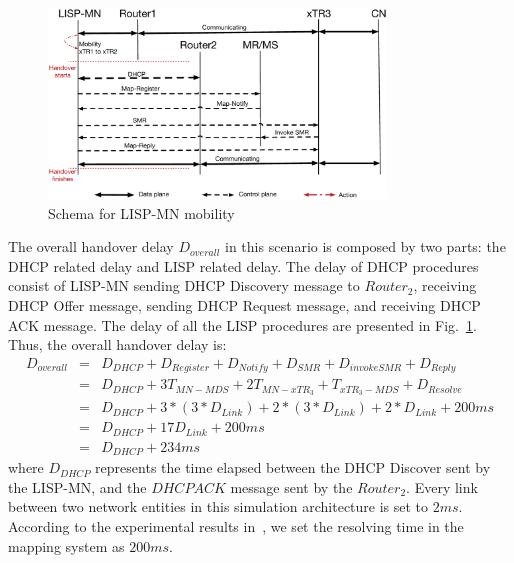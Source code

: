 {%
\begin{figure}[!th]
	\centering
	\includegraphics[width=0.8\textwidth]{Pics/Mobility_LISPMN_schema_SMR_simplify}
	\caption{Schema for LISP-MN mobility}
	\label{sim_schema_LISPMN}
\end{figure}

The overall handover delay $D_{overall}$ in this scenario is composed by two parts: the DHCP related delay and LISP related delay. The delay of DHCP procedures consist of LISP-MN sending DHCP Discovery message to $Router_2$, receiving DHCP Offer message, sending DHCP Request message, and receiving DHCP ACK message. The delay of all the LISP procedures are presented in Fig.~\ref{sim_schema_LISPMN}. Thus, the overall handover delay is:
\begin{eqnarray}
D_{overall} &=& D_{DHCP} + D_{Register} + D_{Notify} + D_{SMR} + D_{invokeSMR} + D_{Reply} \nonumber \\
&=& D_{DHCP} + 3T_{MN-MDS} + 2T_{MN-xTR_3} + T_{xTR_3-MDS} + D_{Resolve} \nonumber \\
&=& D_{DHCP} + 3* (3*D_{Link}) + 2*(3*D_{Link}) + 2*D_{Link} + 200ms\nonumber \\
&=& D_{DHCP} + 17D_{Link} + 200 ms  \\
&=& D_{DHCP} + 234 ms \nonumber
\end{eqnarray}
where $D_{DHCP}$ represents the time elapsed between the DHCP Discover sent by the LISP-MN, and the $DHCP ACK$ message sent by the $Router_2$. Every link between two network entities in this simulation architecture is set to $2 ms$. According to the experimental results in~\cite{coras2014performance}, we set the resolving time in the mapping system as $200 ms$. %

}
